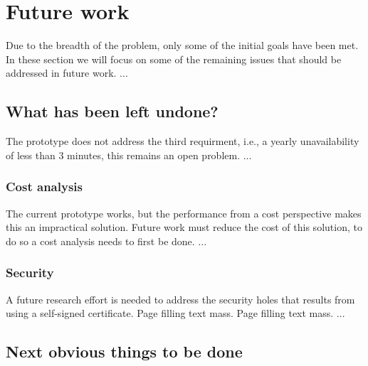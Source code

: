 \documentclass[english, biblatex, digitaloutput]{kththesis}
\begin{document}
\section{Future work}
\label{sec:futureWork}


Due to the breadth of the problem, only some of the initial goals have been
met. In these section we will focus on some of the remaining issues that
should be addressed in future work. ...

\subsection{What has been left undone?}
\label{what-has-been-left-undone}

The prototype does not address the third requirment, i.e., a yearly
unavailability of less than 3 minutes, this remains an open problem. ...

\subsubsection{Cost analysis}

The current prototype works, but the performance from a cost perspective makes
this an impractical solution. Future work must reduce the cost of this
solution, to do so a cost analysis needs to first be done. ...

\subsubsection{Security}

A future research effort is needed to address the security holes that results
from using a self-signed certificate. Page filling text mass. Page filling
text mass. ...


\subsection{Next obvious things to be done}
\end{document}
